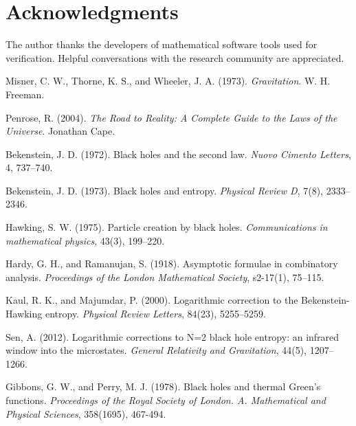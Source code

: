 \documentclass[12pt, letterpaper]{article}
\begin{document}
\section*{Acknowledgments}
The author thanks the developers of mathematical software tools used for verification. Helpful conversations with the research community are appreciated.


\begin{thebibliography}{9}

Misner, C. W., Thorne, K. S., and Wheeler, J. A. (1973). \textit{Gravitation}. W. H. Freeman.

Penrose, R. (2004). \textit{The Road to Reality: A Complete Guide to the Laws of the Universe}. Jonathan Cape.

Bekenstein, J. D. (1972). Black holes and the second law. \textit{Nuovo Cimento Letters}, 4, 737–740.

Bekenstein, J. D. (1973). Black holes and entropy. \textit{Physical Review D}, 7(8), 2333–2346.

Hawking, S. W. (1975). Particle creation by black holes. \textit{Communications in mathematical physics}, 43(3), 199–220.

Hardy, G. H., and Ramanujan, S. (1918). Asymptotic formulae in combinatory analysis. \textit{Proceedings of the London Mathematical Society}, s2-17(1), 75–115.

Kaul, R. K., and Majumdar, P. (2000). Logarithmic correction to the Bekenstein-Hawking entropy. \textit{Physical Review Letters}, 84(23), 5255–5259.

Sen, A. (2012). Logarithmic corrections to N=2 black hole entropy: an infrared window into the microstates. \textit{General Relativity and Gravitation}, 44(5), 1207–1266.

Gibbons, G. W., and Perry, M. J. (1978). Black holes and thermal Green's functions.
\textit{Proceedings of the Royal Society of London. A. Mathematical and Physical Sciences},
358(1695), 467-494.

\end{thebibliography}
\end{document}
